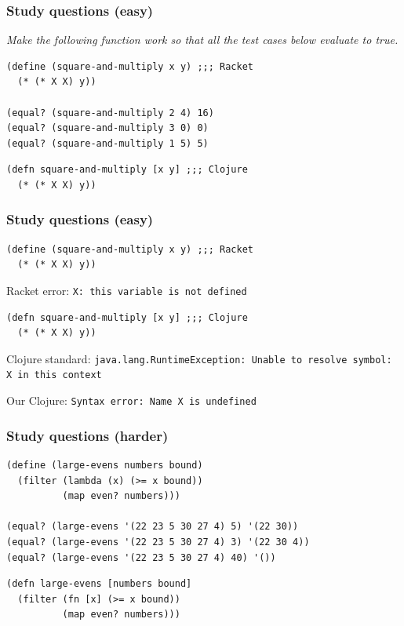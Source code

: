 \documentclass{beamer}
\begin{document}
\begin{frame}[fragile]
\frametitle{Study questions (easy)}
{\it Make the following function work so that all the test cases below evaluate to true. }
\begin{verbatim}
(define (square-and-multiply x y) ;;; Racket
  (* (* X X) y))

(equal? (square-and-multiply 2 4) 16)
(equal? (square-and-multiply 3 0) 0)
(equal? (square-and-multiply 1 5) 5)
\end{verbatim}

\begin{verbatim}
(defn square-and-multiply [x y] ;;; Clojure
  (* (* X X) y))
\end{verbatim}
\end{frame}

\begin{frame}[fragile]
\frametitle{Study questions (easy)}
\begin{verbatim}
(define (square-and-multiply x y) ;;; Racket
  (* (* X X) y))
\end{verbatim}
Racket error: {\tt X: this variable is not defined} 

\begin{verbatim}
(defn square-and-multiply [x y] ;;; Clojure
  (* (* X X) y))
\end{verbatim}

Clojure standard: {\tt java.lang.RuntimeException: Unable to resolve symbol: X in this context}


\vspace*{.2in}

Our Clojure: {\tt Syntax error: Name X is undefined}

\end{frame}

\begin{frame}[fragile]
\frametitle{Study questions (harder)}
\begin{verbatim}
(define (large-evens numbers bound)
  (filter (lambda (x) (>= x bound))
          (map even? numbers)))

(equal? (large-evens '(22 23 5 30 27 4) 5) '(22 30))
(equal? (large-evens '(22 23 5 30 27 4) 3) '(22 30 4))
(equal? (large-evens '(22 23 5 30 27 4) 40) '())
\end{verbatim}
\begin{verbatim}
(defn large-evens [numbers bound]
  (filter (fn [x] (>= x bound))
          (map even? numbers)))
\end{verbatim}
\end{frame}
\end{document}
